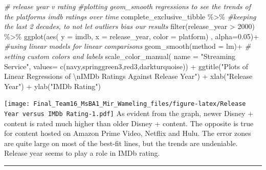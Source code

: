 \documentclass[
]{article}
\newenvironment{Shaded}{\begin{snugshade}}{\end{snugshade}}
\newcommand{\AttributeTok}[1]{\textcolor[rgb]{0.77,0.63,0.00}{#1}}
\newcommand{\CommentTok}[1]{\textcolor[rgb]{0.56,0.35,0.01}{\textit{#1}}}
\newcommand{\DecValTok}[1]{\textcolor[rgb]{0.00,0.00,0.81}{#1}}
\newcommand{\FloatTok}[1]{\textcolor[rgb]{0.00,0.00,0.81}{#1}}
\newcommand{\FunctionTok}[1]{\textcolor[rgb]{0.00,0.00,0.00}{#1}}
\newcommand{\NormalTok}[1]{#1}
\newcommand{\SpecialCharTok}[1]{\textcolor[rgb]{0.00,0.00,0.00}{#1}}
\newcommand{\StringTok}[1]{\textcolor[rgb]{0.31,0.60,0.02}{#1}}
\begin{document}
\begin{Shaded}
\begin{Highlighting}[]
\CommentTok{\# release year v rating}
\CommentTok{\#plotting geom\_smooth regressions to see the trends of the platforms imdb ratings over time}
\NormalTok{complete\_exclusive\_tibble }\SpecialCharTok{\%\textgreater{}\%} 
  \CommentTok{\#keeping the last 2 decades, to not let outliers bias our results}
  \FunctionTok{filter}\NormalTok{(release\_year }\SpecialCharTok{\textgreater{}} \DecValTok{2000}\NormalTok{) }\SpecialCharTok{\%\textgreater{}\%}  
  \FunctionTok{ggplot}\NormalTok{(}\FunctionTok{aes}\NormalTok{(}
    \AttributeTok{y =}\NormalTok{ imdb, }
    \AttributeTok{x =}\NormalTok{ release\_year, }
    \AttributeTok{color =}\NormalTok{ platform) , }
    \AttributeTok{alpha=}\FloatTok{0.05}\NormalTok{)}\SpecialCharTok{+}
  \CommentTok{\#using linear models for linear comparisons}
  \FunctionTok{geom\_smooth}\NormalTok{(}\AttributeTok{method =} \StringTok{\textquotesingle{}lm\textquotesingle{}}\NormalTok{)}\SpecialCharTok{+}
  \CommentTok{\# setting custom colors and labels}
  \FunctionTok{scale\_color\_manual}\NormalTok{(}
    \AttributeTok{name =} \StringTok{"Streaming Service"}\NormalTok{,}
    \AttributeTok{values=} \FunctionTok{c}\NormalTok{(}\StringTok{\textquotesingle{}navy\textquotesingle{}}\NormalTok{,}\StringTok{\textquotesingle{}springgreen3\textquotesingle{}}\NormalTok{,}\StringTok{\textquotesingle{}red3\textquotesingle{}}\NormalTok{,}\StringTok{\textquotesingle{}darkturquoise\textquotesingle{}}\NormalTok{)) }\SpecialCharTok{+}
  \FunctionTok{ggtitle}\NormalTok{(}\StringTok{"Plots of Linear Regressions of }\SpecialCharTok{\textbackslash{}n}\StringTok{IMDb Ratings Against Release Year"}\NormalTok{) }\SpecialCharTok{+}
  \FunctionTok{xlab}\NormalTok{(}\StringTok{"Release Year"}\NormalTok{) }\SpecialCharTok{+} 
  \FunctionTok{ylab}\NormalTok{(}\StringTok{"IMDb Rating"}\NormalTok{)}
\end{Highlighting}
\end{Shaded}

\texttt{[image: Final\_Team16\_MsBA1\_Mir\_Wameling\_files/figure-latex/Release Year versus IMDb Rating-1.pdf]}
As evident from the graph, newer Disney + content is rated much higher
than older Disney + content. The opposite is true for content hosted on
Amazon Prime Video, Netflix and Hulu. The error zones are quite large on
most of the best-fit lines, but the trends are undeniable. Release year
seems to play a role in IMDb rating.

\begin{center}\rule{0.5\linewidth}{0.5pt}\end{center}
\end{document}
